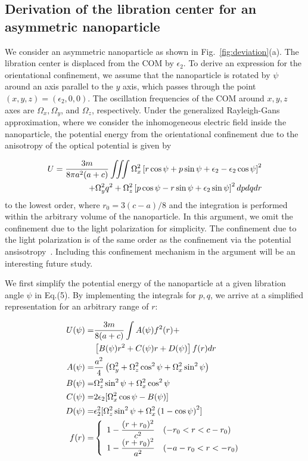 \documentclass[aps, prl, 
amsmath, showpacs, preprintnumbers, twocolumn, amssymb, amsmath, superscriptaddress]{revtex4-1}
\begin{document}
\subsection{Derivation of the libration center for an asymmetric nanoparticle}
We consider an asymmetric nanoparticle as shown in Fig.~\ref{fig:deviation}(a). The libration center  is displaced from the COM by $\epsilon_2$. To derive an expression for the orientational confinement, we assume that the nanoparticle is rotated by $\psi$ around an axis parallel to the $y$ axis, which passes through the point $(x,y,z)=(\epsilon_2,0,0)$. The oscillation frequencies of the COM around $x,y,z$ axes are $\Omega_x,\Omega_y$, and $\Omega_z$, respectively. Under the generalized Rayleigh-Gans approximation, where we consider the inhomogeneous electric field inside the nanoparticle, the potential energy from the orientational confinement due to the anisotropy of the optical potential is given by~\cite{seberson2020stability,kamba2023nanoscale}

\begin{align}
U=\dfrac{3m}{8\pi a^2(a+c)} \iiint  \Omega_x^2 \left[ r\cos\psi+p\sin \psi +\epsilon_2 -\epsilon_2 \cos\psi  \right]^2\notag \\ +\Omega_y^2q^2
+\Omega_z^2 \left[ p\cos\psi-r\sin\psi+\epsilon_2 \sin\psi \right]^2 dp dq dr
\end{align}
to the lowest order, where $r_0=3(c-a)/8$ and the integration is performed within the arbitrary volume of the nanoparticle. In this argument, we omit the confinement due to the light polarization for simplicity. The confinement due to the light polarization is of the same order as the confinement via the potential ansisotropy~\cite{ruijgrok2011brownian,trojek2012optical,ruijgrok2011brownian,hoang2016torsional,bang2020five,van2021sub,kamba2023nanoscale}.  Including this confinement mechanism in the argument will be an interesting future study. 

We first simplify the potential energy of the nanoparticle at a given libration angle $\psi$ in Eq.(5). By implementing the integrals for $p,q$, we arrive at a simplified representation for an arbitrary range of $r$:

\begin{align}
U(\psi)=&\dfrac{3m}{8(a+c)} \int A(\psi) f^2(r) + \notag \\ &\left[ B(\psi) r^2+C(\psi)r+D(\psi) \right]f(r) dr \\
A(\psi)=&\dfrac{a^2}{4} \left( \Omega_y^2+\Omega_z^2 \cos^2 \psi + \Omega_x^2 \sin^2 \psi \right) \notag \\
B(\psi)=& \Omega_z^2 \sin^2 \psi + \Omega_x^2 \cos^2 \psi \notag \\
C(\psi) =&2\epsilon_2 [\Omega_x^2 \cos\psi- B(\psi)] \notag \\
D(\psi)=&\epsilon_2^2 [\Omega_z^2 \sin^2\psi+\Omega_x^2\left (1-\cos \psi \right )^2] \notag  \\
f(r)=&\left\{ \begin{array}{ll}
1-\dfrac{(r+r_0)^2}{c^2} & (-r_0<r<c-r_0) \notag \\
1-\dfrac{(r+r_0)^2}{a^2} & (-a-r_0<r<-r_0) 
\end{array} \right.
\end{align}
\end{document}
